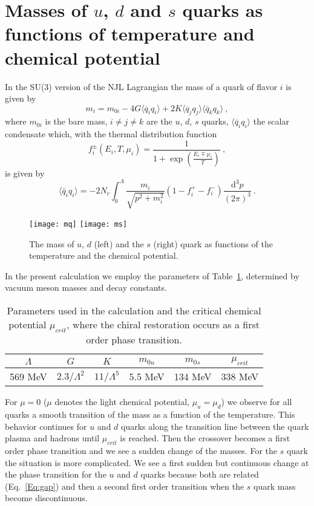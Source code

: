 \documentclass[a4paper]{jpconf}
\begin{document}
\section{Masses of $u$, $d$ and $s$ quarks as functions of temperature and chemical potential}
In the SU(3) version of the NJL Lagrangian the mass of a quark of flavor $i$ is given by 
\begin{equation}
m_i = m_{0i} - 4G \langle \overline{q}_i  q_i \rangle + 2 K \langle \overline{q}_j q_j \rangle \langle \overline{q}_k  q_k \rangle \ ,
\label{Eq:gap}
\end{equation}
where $m_{0i}$ is the bare mass,  $i \neq j \neq k$ are the $u$, $d$, $s$ quarks, $ \langle \overline{q}_i  q_i \rangle$ the scalar condensate which, with the thermal distribution function
\begin{equation}
f^\pm_i(E_i,T,\mu_i) = \frac{1}{1+\exp \left( \frac{E_i \mp \mu_i}{T} \right)} \ ,
\end{equation}
is given by 
\begin{equation}
\langle \bar{q}_i q_i \rangle= - 2 N_c  \int_0^\Lambda \frac{m_i}{\sqrt{p^2+m_i^2}}(1-f_i^{+}-f_i^{-}) \frac{\mathrm{d}^3p}{(2 \pi)^3} \ .
\end{equation}
\begin{figure}[htp]%
\centering
\texttt{[image: mq]}
\texttt{[image: ms]}%
\caption{\label{fig:masses}The mass of $u$, $d$ (left) and the $s$ (right) quark as functions of the temperature and the chemical potential.}
\end{figure}
 In the present calculation we employ the parameters of Table~\ref{tab:para}, determined by vacuum meson masses and decay constants.
\begin{center}
\begin{table}[h]
\caption{\label{tab:para}Parameters used in the calculation and the critical chemical potential $\mu_{crit}$, where the chiral restoration occurs as a first order phase transition.}
\centering
\begin{tabular}{|c | c | c | c| c | c |}
\hline
$\Lambda$ & $G$ & $K$ & $m_{0u}$ & $m_{0s}$ & $\mu_{crit}$ \\ \hline
569 MeV & $2.3/\Lambda^2$  & $11/\Lambda^5$ & 5.5 MeV & 134 MeV & 338 MeV\\ \hline
\end{tabular}
\end{table}
\end{center}
For $\mu = 0$ ($\mu$ denotes the light chemical potential, $\mu_u=\mu_d$) we observe for all quarks a smooth transition of the mass as a function of the temperature.  This behavior continues for $u$ and $d$ quarks
along the transition line between the quark plasma and hadrons until $\mu_{crit}$ is reached. Then the crossover becomes a first order phase transition and we see a sudden change of the masses. For the $s$
quark the situation is more complicated. We see a first sudden but continuous change at the phase transition for the $u$ and $d$ quarks because both are related (Eq.~\ref{Eq:gap}) and then a second first order transition when the $s$
quark mass become discontinuous. 
\end{document}
